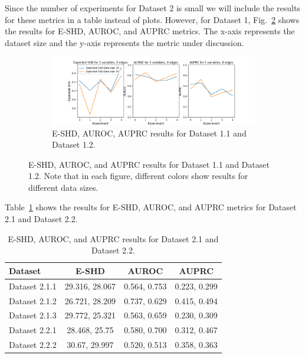 \documentclass{lxaiproposal}
\begin{document}
    Since the number of experiments for Dataset 2 is small we will include the results for these metrics in a
    table instead of plots. However, for Dataset 1, Fig.~\ref{fig:metrics_dataset_1} shows the results for E-SHD, AUROC,
    and AUPRC metrics. The x-axis represents the dataset size and the y-axis represents the metric under discussion.

    \begin{figure}[h]
        \centering
        \begin{subfigure}{0.98\textwidth}
            \centering
            \includegraphics[width=\textwidth]{figures/expected_0_5_8}
            \caption{E-SHD, AUROC, AUPRC results for Dataset 1.1 and Dataset 1.2.}
            \label{fig:eshd_5_8}
        \end{subfigure}
        \caption{E-SHD, AUROC, and AUPRC results for Dataset 1.1 and Dataset 1.2. Note that in each figure, different colors show results for different data
        sizes.}
        \label{fig:metrics_dataset_1}
    \end{figure}

    Table~\ref{tab:metrics_dataset_2} shows the results for E-SHD, AUROC, and AUPRC metrics for Dataset 2.1 and Dataset 2.2.

    \begin{table}[h]
        \centering
        \begin{tabular}{|l|c|c|c|}
            \hline
            \textbf{Dataset} & \textbf{E-SHD} & \textbf{AUROC} & \textbf{AUPRC} \\
            \hline
            Dataset 2.1.1    & 29.316, 28.067 & 0.564, 0.753   & 0.223, 0.299   \\
            Dataset 2.1.2    & 26.721, 28.209 & 0.737, 0.629   & 0.415, 0.494   \\
            Dataset 2.1.3    & 29.772, 25.321 & 0.563, 0.659   & 0.230, 0.309   \\
            Dataset 2.2.1    & 28.468, 25.75  & 0.580, 0.700   & 0.312, 0.467   \\
            Dataset 2.2.2    & 30.67, 29.997  & 0.520, 0.513   & 0.358, 0.363   \\
            \hline
        \end{tabular}
        \caption{E-SHD, AUROC, and AUPRC results for Dataset 2.1 and Dataset 2.2.}
        \label{tab:metrics_dataset_2}
    \end{table}
\end{document}
